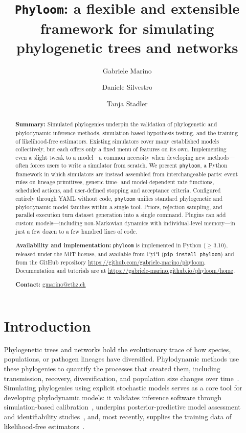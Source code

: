 \documentclass[11pt]{article}
\title{\texttt{Phyloom}: a flexible and extensible framework for simulating phylogenetic trees and networks}
\author[1,2]{Gabriele Marino}
\author[1,2]{Daniele Silvestro}
\author[1,2]{Tanja Stadler}
\affil[1]{Department of Biosystems Science and Engineering, ETH Zurich, Basel, Switzerland}
\affil[2]{SIB Swiss Institute of Bioinformatics, Basel, Switzerland}
\date{}
\begin{document}
\maketitle
\linenumbers

\begin{abstract}
  \noindent\textbf{Summary:} Simulated phylogenies underpin the validation of
  phylogenetic and phylodynamic inference methods, simulation-based hypothesis
  testing, and the training of likelihood-free estimators. Existing simulators
  cover many established models collectively, but each offers only a fixed menu
  of features on its own. Implementing even a slight tweak to a model---a common
  necessity when developing new methods---often forces users to write a
  simulator from scratch. We present \texttt{phyloom}, a Python framework in
  which simulators are instead assembled from interchangeable parts: event rules
  on lineage primitives, generic time- and model-dependent rate functions,
  scheduled actions, and user-defined stopping and acceptance criteria.
  Configured entirely through YAML without code, \texttt{phyloom} unifies
  standard phylogenetic and phylodynamic model families within a single
  tool. Priors, rejection sampling, and parallel execution turn dataset
  generation into a single command. Plugins can add custom
  models---including non-Markovian dynamics with individual-level
  memory---in just a few dozen to a few hundred lines of code.

  \medskip\noindent\textbf{Availability and implementation:} \texttt{phyloom} is
  implemented in Python ($\geq$3.10), released under the MIT license, and
  available from PyPI (\texttt{pip install phyloom}) and from the GitHub repository
  \url{https://github.com/gabriele-marino/phyloom}. Documentation and tutorials
  are at \url{https://gabriele-marino.github.io/phyloom/home}.

  \medskip\noindent\textbf{Contact:} \href{mailto:gmarino@ethz.ch}{gmarino@ethz.ch}
\end{abstract}

\section{Introduction}

Phylogenetic trees and networks hold the evolutionary trace of how species,
populations, or pathogen lineages have diversified. Phylodynamic methods
use these phylogenies to quantify the processes that created them, including
transmission, recovery, diversification, and population size changes over
time~\citep{stadler2024decoding}.
Simulating phylogenies using explicit stochastic models serves as a
core tool for developing phylodynamic models: it validates inference
software through simulation-based
calibration~\citep{talts2018sbc, mendes2025validate},
underpins posterior-predictive model
assessment~\citep{bollback2002adequacy, duchene2019phylodynadequacy}
and identifiability studies~\citep{louca2021identifiability}, and,
most recently, supplies the training data of likelihood-free
estimators~\citep{voznica2022phylodeep, lambert2023deep}.
\end{document}
